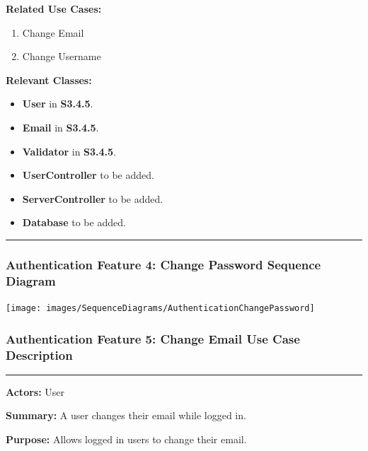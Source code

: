 \documentclass[twoside,letterpaper]{article}
\begin{document}
\noindent\textbf{Related Use Cases:}
\begin{enumerate}
	\item Change Email
	\item Change Username
\end{enumerate}

\noindent\textbf{Relevant Classes:}
\begin{itemize}
	\item \textbf{User} in \textbf{S3.4.5}.
	\item \textbf{Email} in \textbf{S3.4.5}.
	\item \textbf{Validator} in \textbf{S3.4.5}.
	\item \textbf{UserController} to be added.
	\item \textbf{ServerController} to be added.
	\item \textbf{Database} to be added.
\end{itemize}
\vspace{8pt}
\hrule
\newpage

\subsubsection[Authentication Feature 4: Change Password Sequence Diagram]{\rmfamily\bfseries\color{black}
	Authentication Feature 4: Change Password Sequence Diagram}
\hypertarget{RefHeading22059017292}{}

\bigskip

\texttt{[image: images/SequenceDiagrams/AuthenticationChangePassword]}

\newpage

\subsubsection[Authentication Feature 5: Change Email Use Case Description]{\rmfamily\bfseries\color{black}
	Authentication Feature 5: Change Email Use Case Description}
\hypertarget{RefHeading22059017292}{}

\hrule
\vspace{8pt}
\noindent\textbf{Actors:} User \newline

\noindent\textbf{Summary:} A user changes their email while logged in.  \newline

\noindent\textbf{Purpose:} Allows logged in users to change their email.  \newline
\end{document}
